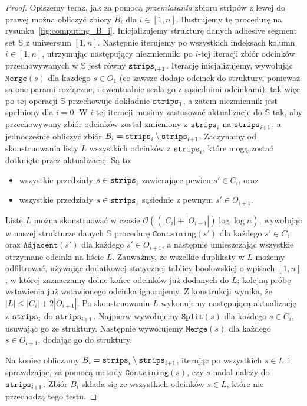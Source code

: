 \documentclass[runningheads]{llncs}
\newcommand{\Oh}{\mathcal{O}}
\renewcommand{\leq}{\leqslant}
\begin{document}
\begin{proof}
	Opiszemy teraz, jak za pomocą {\em{przemiatania}} zbioru stripów z lewej do prawej można obliczyć zbiory $B_i$ dla $i\in [1,n]$. Ilustrujemy tę procedurę na rysunku~\ref{fig:computing_B_i}.
	Inicjalizujemy strukturę danych adhesive segment set $\mathbb{S}$ z uniwersum $[1,n]$. Następnie iterujemy po wszystkich indeksach kolumn $i\in [1,n]$, utrzymując następujący niezmiennik: po $i$-tej iteracji zbiór odcinków przechowywanych w $\mathbb{S}$ jest równy $\mathtt{strips}_{i+1}$. Iterację inicjalizujemy, wywołując $\mathtt{Merge}(s)$ dla każdego $s\in O_1$ (co zawsze dodaje odcinek do struktury, ponieważ są one parami rozłączne, i ewentualnie scala go z sąsiednimi odcinkami); tak więc po tej operacji $\mathbb{S}$ przechowuje dokładnie $\mathtt{strips}_1$, a zatem niezmiennik jest spełniony dla $i=0$. W $i$-tej iteracji musimy zastosować aktualizacje do $\mathbb{S}$ tak, aby przechowywany zbiór odcinków został zmieniony z $\mathtt{strips}_i$ na $\mathtt{strips}_{i+1}$, a jednocześnie obliczyć zbiór $B_i=\mathtt{strips}_i\setminus \mathtt{strips}_{i+1}$. Zaczynamy od skonstruowania listy $L$ wszystkich odcinków z $\mathtt{strips}_i$, które mogą zostać dotknięte przez aktualizację. Są to:
	\begin{itemize}
		\item wszystkie przedziały $s\in \mathtt{strips}_i$ zawierające pewien $s'\in C_i$, oraz
		\item wszystkie przedziały $s\in \mathtt{strips}_i$ sąsiednie z pewnym $s'\in O_{i+1}$.
	\end{itemize}
	Listę $L$ można skonstruować w czasie $\Oh((|C_i|+|O_{i+1}|)\log \log n)$, wywołując w naszej strukturze danych $\mathbb{S}$ procedurę $\mathtt{Containing}(s')$ dla każdego $s'\in C_i$ oraz $\mathtt{Adjacent}(s')$ dla każdego $s'\in O_{i+1}$, a następnie umieszczając wszystkie otrzymane odcinki na liście $L$. Zauważmy, że wszelkie duplikaty w $L$ możemy odfiltrować, używając dodatkowej statycznej tablicy boolowskiej o wpisach $[1,n]$, w której zaznaczamy dolne końce odcinków już dodanych do $L$; kolejną próbę wstawienia już wstawionego odcinka ignorujemy. Z konstrukcji wynika, że $|L|\leq |C_i|+2|O_{i+1}|$. Po skonstruowaniu $L$ wykonujemy następującą aktualizację z $\mathtt{strips}_i$ do $\mathtt{strips}_{i+1}$. Najpierw wywołujemy $\mathtt{Split}(s)$ dla każdego $s\in C_i$, usuwając go ze struktury. Następnie wywołujemy $\mathtt{Merge}(s)$ dla każdego $s\in O_{i+1}$, dodając go do struktury.
	
	Na koniec obliczamy $B_i=\mathtt{strips}_i\setminus \mathtt{strips}_{i+1}$, iterując po wszystkich $s\in L$ i sprawdzając, za pomocą metody $\mathtt{Containing}(s)$, czy $s$ nadal należy do $\mathtt{strips}_{i+1}$. Zbiór $B_i$ składa się ze wszystkich odcinków $s\in L$, które nie przechodzą tego testu.
	

\end{proof}
\end{document}
